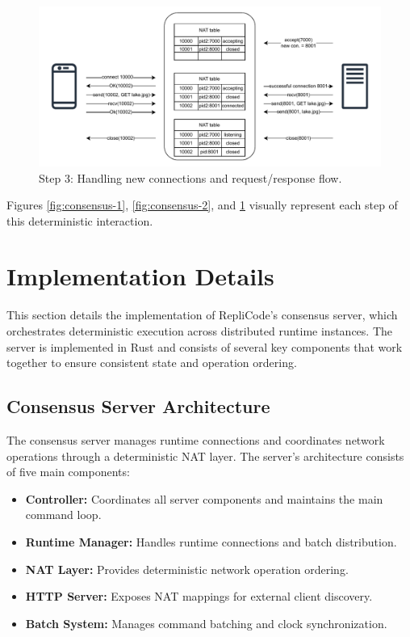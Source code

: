 \documentclass[10pt]{IEEEtran}
\begin{document}
\begin{figure}[h]
\centering
\includegraphics[width=0.9\linewidth]{consensus_diagram_3.pdf}
\caption{Step 3: Handling new connections and request/response flow.}
\label{fig:consensus-3}
\end{figure}

Figures \ref{fig:consensus-1}, \ref{fig:consensus-2}, and \ref{fig:consensus-3} visually represent each step of this deterministic interaction.


\section{Implementation Details}

This section details the implementation of RepliCode's consensus server, which orchestrates deterministic execution across distributed runtime instances. The server is implemented in Rust and consists of several key components that work together to ensure consistent state and operation ordering.

\subsection{Consensus Server Architecture}

The consensus server manages runtime connections and coordinates network operations through a deterministic NAT layer. The server's architecture consists of five main components:

\begin{itemize}
    \item \textbf{Controller:} Coordinates all server components and maintains the main command loop.
    \item \textbf{Runtime Manager:} Handles runtime connections and batch distribution.
    \item \textbf{NAT Layer:} Provides deterministic network operation ordering.
    \item \textbf{HTTP Server:} Exposes NAT mappings for external client discovery.
    \item \textbf{Batch System:} Manages command batching and clock synchronization.
\end{itemize}
\end{document}
